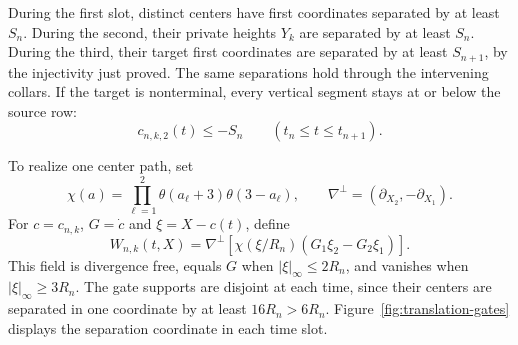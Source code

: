 During the first slot, distinct centers have first coordinates
separated by at least $S_n$.  During the second, their private
heights $Y_k$ are separated by at least $S_n$.  During the third,
their target first coordinates are separated by at least
$S_{n+1}$, by the injectivity just proved.  The same separations
hold through the intervening collars.  If the target is nonterminal,
every vertical segment stays at or below the source row:
\begin{equation}\label{cbe:negative}
 c_{n,k,2}(t)\le-S_n\qquad(t_n\le t\le t_{n+1}).
\end{equation}

To realize one center path, set
\[
 \chi(a)=\prod_{\ell=1}^2\theta(a_\ell+3)\theta(3-a_\ell),
 \qquad \nabla^\perp=(\partial_{X_2},-\partial_{X_1}).
\]
For $c=c_{n,k}$, $G=\dot c$ and $\xi=X-c(t)$, define
\begin{equation}\label{cbe:gate}
 W_{n,k}(t,X)=\nabla^\perp
   \left[\chi(\xi/R_n)(G_1\xi_2-G_2\xi_1)\right].
\end{equation}
This field is divergence free, equals $G$ when
$|\xi|_\infty\le2R_n$, and vanishes when
$|\xi|_\infty\ge3R_n$.  The gate supports are disjoint at each
time, since their centers are separated in one coordinate by at
least $16R_n>6R_n$.
Figure~\ref{fig:translation-gates} displays the separation coordinate
in each time slot.

